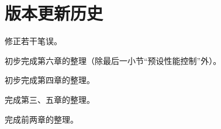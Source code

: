 \chapter*{版本更新历史}


\begin{change}
  \item 修正若干笔误。
\end{change}


\begin{change}
  \item 初步完成第六章的整理（除最后一小节“预设性能控制”外）。
\end{change}


\begin{change}
  \item 初步完成第四章的整理。
\end{change}


\begin{change}
  \item 完成第三、五章的整理。
\end{change}


\begin{change}
  \item 完成前两章的整理。
\end{change}